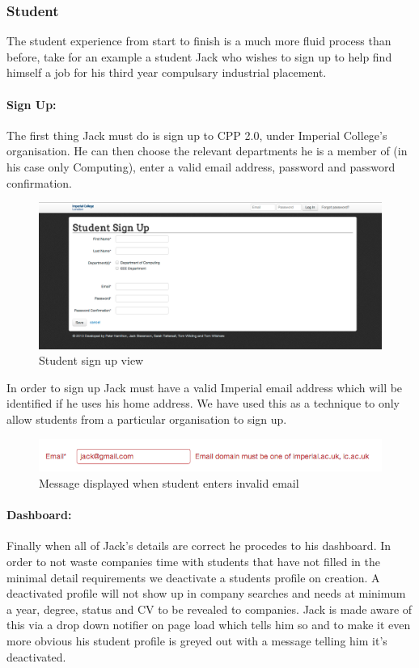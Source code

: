 \subsubsection{Student}
The student experience from start to finish is a much more fluid process than before, take for an example a student Jack who wishes to sign up to help find himself a job for his third year compulsary industrial placement.
  \paragraph{Sign Up:}
    The first thing Jack must do is sign up to CPP 2.0, under Imperial College's organisation. He can then choose the relevant departments he is a member of (in his case only Computing), enter a valid email address, password and password confirmation.

    \begin{figure}[H]\centering
    \includegraphics[scale=0.3]{images/user_experiences/student/sign_up_page}
    \caption{Student sign up view}
    \end{figure}

    In order to sign up Jack must have a valid Imperial email address which will be identified if he uses his home address. We have used this as a technique to only allow students from a particular organisation to sign up.

    \begin{figure}[H]\centering
    \includegraphics[scale=0.5]{images/user_experiences/student/invalid_email}
    \caption{Message displayed when student enters invalid email}
    \end{figure}

  \paragraph{Dashboard:}
    Finally when all of Jack's details are correct he procedes to his dashboard. In order to not waste companies time with students that have not filled in the minimal detail requirements we deactivate a students profile on creation. A deactivated profile will not show up in company searches and needs at minimum a year, degree, status and CV to be revealed to companies. 
    Jack is made aware of this via a drop down notifier on page load which tells him so and to make it even more obvious his student profile is greyed out with a message telling him it's deactivated.

